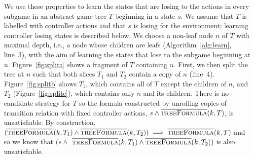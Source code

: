 We use these properties to learn the states that are losing to the actions in every subgame in an abstract game tree $T$ beginning in a state $s$. We assume that $T$ is labelled with controller actions and that $s$ is losing for the environment; learning controller losing states is described below.  We choose a non-leaf node $n$ of $T$ with maximal depth, i.e., a node whose children are leafs (Algorithm~\ref{alg:learn}, line~3), with the aim of learning the states that lose to the subgame beginning at $n$. Figure~\ref{fig:splita} shows a fragment of $T$ containing $n$.  First, we then split the tree at $n$ such that both slices $T_1$ and $T_2$ contain a copy of $n$ (line~4).  Figure~\ref{fig:splitb} shows $T_1$, which contains all of $T$ except the children of $n$, and $T_2$ (Figure~\ref{fig:splitc}), which contains only $n$ and its children.  There is no candidate strategy for $T$ so the formula constructed by unrolling copies of transition relation with fixed controller actions, $s \land \textsc{$\overline{\mbox{treeFormula}}$}(k, T)$, is unsatisfiable.  By construction, $ (\textsc{$\overline{\mbox{treeFormula}}$}(k, T_1) \land \textsc{$\overline{\mbox{treeFormula}}$}(k, T_2)) \implies \textsc{$\overline{\mbox{treeFormula}}$}(k, T)$ and so we know that $(s \land$ $\textsc{$\overline{\mbox{treeFormula}}$}(k, T_1) \land \textsc{$\overline{\mbox{treeFormula}}$}(k, T_2))$ is also unsatisfiable.  

